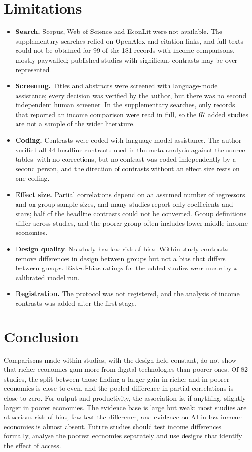 \documentclass[11pt,a4paper]{article}
\begin{document}
\section{Limitations}\label{sec:limits}
\begin{itemize}[leftmargin=1.4em,itemsep=2pt]
\item \textbf{Search.} Scopus, Web of Science and EconLit were not available. The supplementary searches relied on OpenAlex and citation links, and full texts could not be obtained for 99 of the 181 records with income comparisons, mostly paywalled; published studies with significant contrasts may be over-represented.
\item \textbf{Screening.} Titles and abstracts were screened with language-model assistance; every decision was verified by the author, but there was no second independent human screener. In the supplementary searches, only records that reported an income comparison were read in full, so the 67 added studies are not a sample of the wider literature.
\item \textbf{Coding.} Contrasts were coded with language-model assistance. The author verified all 44 headline contrasts used in the meta-analysis against the source tables, with no corrections, but no contrast was coded independently by a second person, and the direction of contrasts without an effect size rests on one coding.
\item \textbf{Effect size.} Partial correlations depend on an assumed number of regressors and on group sample sizes, and many studies report only coefficients and stars; half of the headline contrasts could not be converted. Group definitions differ across studies, and the poorer group often includes lower-middle income economies.
\item \textbf{Design quality.} No study has low risk of bias. Within-study contrasts remove differences in design between groups but not a bias that differs between groups. Risk-of-bias ratings for the added studies were made by a calibrated model run.
\item \textbf{Registration.} The protocol was not registered, and the analysis of income contrasts was added after the first stage.
\end{itemize}

\section{Conclusion}\label{sec:conclusion}
Comparisons made within studies, with the design held constant, do not show that richer economies gain more from digital technologies than poorer ones. Of 82 studies, the split between those finding a larger gain in richer and in poorer economies is close to even, and the pooled difference in partial correlations is close to zero. For output and productivity, the association is, if anything, slightly larger in poorer economies. The evidence base is large but weak: most studies are at serious risk of bias, few test the difference, and evidence on AI in low-income economies is almost absent. Future studies should test income differences formally, analyse the poorest economies separately and use designs that identify the effect of access.
\end{document}
